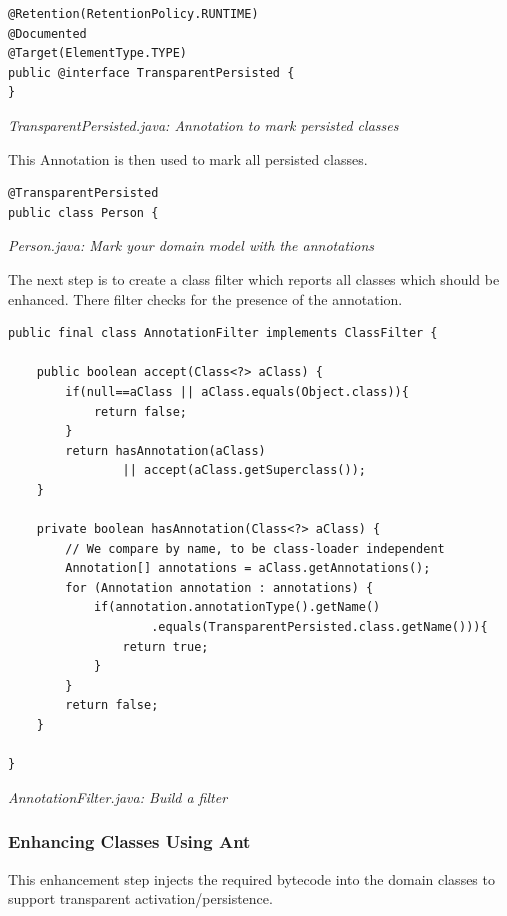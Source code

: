 \begin{lstlisting}
@Retention(RetentionPolicy.RUNTIME)
@Documented
@Target(ElementType.TYPE)
public @interface TransparentPersisted {
}
\end{lstlisting}

{\small\itshape TransparentPersisted.java: Annotation to mark persisted classes\par}
\medskip

This Annotation is then used to mark all persisted classes.

\begin{lstlisting}
@TransparentPersisted
public class Person {
\end{lstlisting}

{\small\itshape Person.java: Mark your domain model with the annotations\par}
\medskip

The next step is to create a class filter which reports all classes which should be enhanced. There filter checks for the presence of the annotation.

\begin{lstlisting}
public final class AnnotationFilter implements ClassFilter {

    public boolean accept(Class<?> aClass) {
        if(null==aClass || aClass.equals(Object.class)){
            return false;
        }
        return hasAnnotation(aClass)
                || accept(aClass.getSuperclass());
    }

    private boolean hasAnnotation(Class<?> aClass) {
        // We compare by name, to be class-loader independent
        Annotation[] annotations = aClass.getAnnotations();
        for (Annotation annotation : annotations) {
            if(annotation.annotationType().getName()
                    .equals(TransparentPersisted.class.getName())){
                return true;
            }
        }
        return false;
    }

}
\end{lstlisting}

{\small\itshape AnnotationFilter.java: Build a filter\par}
\medskip

\subsubsection*{Enhancing Classes Using Ant}

This enhancement step injects the required bytecode into the domain classes to support transparent activation/persistence.

